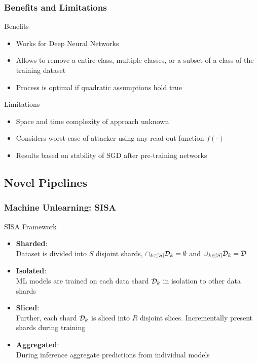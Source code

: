 \documentclass[pdf]{beamer}
\begin{document}
\begin{frame}
  \frametitle{Benefits and Limitations}
  \begin{block}{Benefits}
    \begin{itemize}
      \item Works for Deep Neural Networks
      \item Allows to remove a entire class, multiple classes, or a subset of a class of the training dataset
      \item Process is optimal if quadratic assumptions hold true
    \end{itemize}
  \end{block}

  \begin{alertblock}{Limitations}
    \begin{itemize}
      \item Space and time complexity of approach unknown
      \item Considers worst case of attacker using any read-out function $f(\cdot)$
      \item Results based on stability of SGD after pre-training networks
    \end{itemize}
  \end{alertblock}
\end{frame}

\subsection{Novel Pipelines}
\begin{frame}
  \myNset[4]
  \smartart
\end{frame}


\begin{frame}
  \frametitle{
    Machine Unlearning: SISA \cite{bourtouleMachineUnlearning2020}
    }
  SISA Framework 
  \begin{itemize}
    \item {\bf Sharded}:\\
    Dataset is divided into $S$ disjoint shards, $\cap_{k \in [S]}\mathcal{D}_{k}=\emptyset$ and $\cup_{k\in[S]}\mathcal{D}_{k}=\mathcal{D}$
    \item {\bf Isolated}:\\
    ML models are trained on each data shard $\mathcal{D}_{k}$ in isolation to other data shards
    \item {\bf Sliced}:\\
    Further, each shard $\mathcal{D}_{k}$ is sliced into $R$ disjoint slices. Incrementally present shards during training
    \item {\bf Aggregated}:\\
    During inference aggregate predictions from individual models 
  \end{itemize}
\end{frame}
\end{document}
